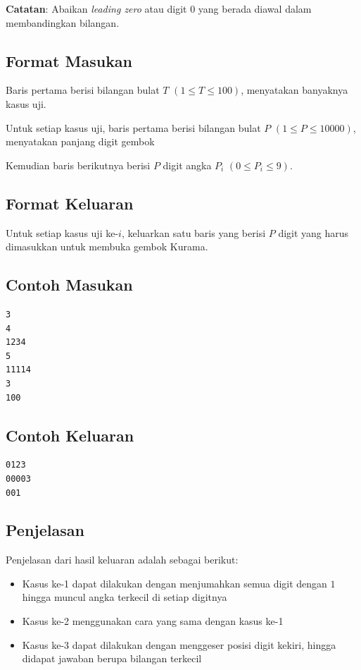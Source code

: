 \documentclass{article}
\begin{document}
\textbf{Catatan}: Abaikan \textit{leading zero} atau digit $0$ yang berada diawal dalam membandingkan bilangan.

\subsection*{Format Masukan}
Baris pertama berisi bilangan bulat $T$ $(1 \leq T \leq 100)$, menyatakan banyaknya kasus uji.

Untuk setiap kasus uji, baris pertama berisi bilangan bulat $P$ $(1 \leq P \leq 10000)$, menyatakan panjang digit gembok

Kemudian baris berikutnya berisi $P$ digit angka $P_i$ $(0 \leq P_i \leq 9)$.

\subsection*{Format Keluaran}
Untuk setiap kasus uji ke-$i$, keluarkan satu baris yang berisi $P$ digit yang harus dimasukkan untuk membuka gembok Kurama.

\begin{multicols}{2}
\subsection*{Contoh Masukan}
\begin{lstlisting}
3
4
1234
5
11114
3
100

\end{lstlisting}
\columnbreak
\subsection*{Contoh Keluaran}
\begin{lstlisting}
0123
00003
001
\end{lstlisting}
\vfill
\null
\end{multicols}
\pagebreak
\subsection*{Penjelasan}
Penjelasan dari hasil keluaran adalah sebagai berikut:
\begin{itemize}
    \item Kasus ke-1 dapat dilakukan dengan menjumahkan semua digit dengan $1$ hingga muncul angka terkecil di setiap digitnya
    \item Kasus ke-2 menggunakan cara yang sama dengan kasus ke-1
    \item Kasus ke-3 dapat dilakukan dengan menggeser posisi digit kekiri, hingga didapat jawaban berupa bilangan terkecil
\end{itemize}
\pagebreak
\end{document}
